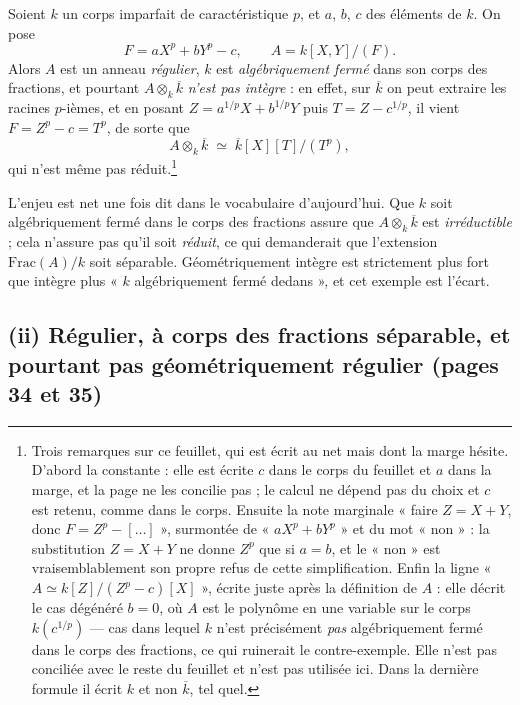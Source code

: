 \documentclass[11pt,a4paper]{article}
\begin{document}
Soient $k$ un corps imparfait de caractéristique $p$, et $a$, $b$, $c$ des
éléments de $k$. On pose
\[
  F = a X^{p} + b Y^{p} - c , \qquad A = k[X,Y]/(F) .
\]
Alors $A$ est un anneau \emph{régulier}, $k$ est \emph{algébriquement fermé}
dans son corps des fractions, et pourtant $A \otimes_{k} \overline{k}$
\emph{n'est pas intègre} : en effet, sur $\overline{k}$ on peut extraire les
racines $p$-ièmes, et en posant $Z = a^{1/p} X + b^{1/p} Y$ puis $T = Z -
c^{1/p}$, il vient $F = Z^{p} - c = T^{p}$, de sorte que
\[
  A \otimes_{k} \overline{k} \;\simeq\; \overline{k}[X][T]/(T^{p}) ,
\]
qui n'est même pas réduit.\footnote{Trois remarques sur ce feuillet, qui est
écrit au net mais dont la marge hésite. D'abord la constante : elle est écrite
$c$ dans le corps du feuillet et $a$ dans la marge, et la page ne les concilie
pas ; le calcul ne dépend pas du choix et $c$ est retenu, comme dans le corps.
Ensuite la note marginale « faire $Z = X + Y$, donc $F = Z^{p} - [\ldots]$ »,
surmontée de « $a X^{p} + b Y^{p}$ » et du mot « non » : la substitution
$Z = X+Y$ ne donne $Z^p$ que si $a = b$, et le « non » est vraisemblablement son
propre refus de cette simplification. Enfin la ligne « $A \simeq
k[Z]/(Z^{p}-c)[X]$ », écrite juste après la définition de $A$ : elle décrit le
cas dégénéré $b = 0$, où $A$ est le polynôme en une variable sur le corps
$k(c^{1/p})$ — cas dans lequel $k$ n'est précisément \emph{pas} algébriquement
fermé dans le corps des fractions, ce qui ruinerait le contre-exemple. Elle
n'est pas conciliée avec le reste du feuillet et n'est pas utilisée ici. Dans
la dernière formule il écrit $k$ et non $\overline{k}$, tel quel.}

L'enjeu est net une fois dit dans le vocabulaire d'aujourd'hui. Que $k$ soit
algébriquement fermé dans le corps des fractions assure que $A \otimes_k
\overline{k}$ est \emph{irréductible} ; cela n'assure pas qu'il soit
\emph{réduit}, ce qui demanderait que l'extension $\mathrm{Frac}(A)/k$ soit
séparable. Géométriquement intègre est strictement plus fort que intègre plus
« $k$ algébriquement fermé dedans », et cet exemple est l'écart.

\subsection*{(ii) Régulier, à corps des fractions séparable, et pourtant pas géométriquement régulier (pages 34 et 35)}
\end{document}
